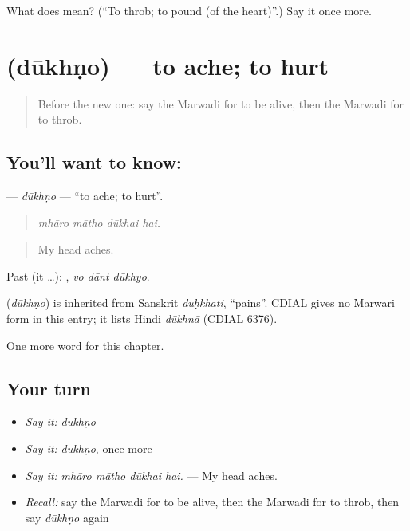 \begin{tcolorbox}[breakable,colback=teal!4,colframe=teal!35!black,title={Before you move on}]
What does  mean? (\textquotedblleft{}To throb; to pound (of the heart)\textquotedblright{}.) Say it once more.
\end{tcolorbox}
\section[\texorpdfstring{\mw{दूखणो} (dūkhṇo)}{दूखणो (dūkhṇo)}]{ (dūkhṇo) — to ache; to hurt}

\label{lesson:MW-C253-dukhno}



\begin{quote}
Before the new one: say the Marwadi for to be alive, then the Marwadi for to throb.
\end{quote}

\subsection*{You'll want to know: }
\textbf{} — \emph{dūkhṇo} — \textquotedblleft{}to ache; to hurt\textquotedblright{}.

\begin{quote}
   
\end{quote}

\begin{quote}
\emph{mhāro mātho dūkhai hai.}
\end{quote}

\begin{quote}
My head aches.
\end{quote}

Past (it …):   , \emph{vo dānt dūkhyo}.

\begin{cousinweb}
\textbf{} (\emph{dūkhṇo}) is inherited from Sanskrit \emph{duḥkhati}, \textquotedblleft{}pains\textquotedblright{}. CDIAL gives no Marwari form in this entry; it lists Hindi \emph{dūkhnā} (CDIAL 6376).
\end{cousinweb}

\begin{grammarlens}[title={What you've built}]
One more word for this chapter.
\end{grammarlens}

\subsection*{Your turn}
\begin{itemize}
\raggedright
  \item \emph{Say it:} \emph{dūkhṇo}
  \item \emph{Say it:} \emph{dūkhṇo}, once more
  \item \emph{Say it:} \emph{mhāro mātho dūkhai hai.} — My head aches.
  \item \emph{Recall:} say the Marwadi for to be alive, then the Marwadi for to throb, then say \emph{dūkhṇo} again
\end{itemize}

